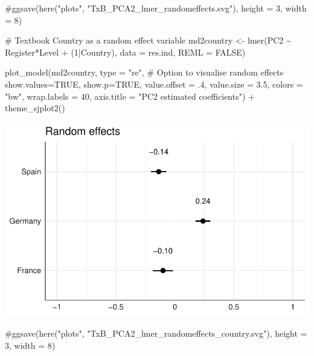 \documentclass[
  letterpaper,
  DIV=11,
  numbers=noendperiod]{scrreprt}
\newenvironment{Shaded}{\begin{snugshade}}{\end{snugshade}}
\newcommand{\AttributeTok}[1]{\textcolor[rgb]{0.40,0.45,0.13}{#1}}
\newcommand{\CommentTok}[1]{\textcolor[rgb]{0.37,0.37,0.37}{#1}}
\newcommand{\ConstantTok}[1]{\textcolor[rgb]{0.56,0.35,0.01}{#1}}
\newcommand{\DecValTok}[1]{\textcolor[rgb]{0.68,0.00,0.00}{#1}}
\newcommand{\FloatTok}[1]{\textcolor[rgb]{0.68,0.00,0.00}{#1}}
\newcommand{\FunctionTok}[1]{\textcolor[rgb]{0.28,0.35,0.67}{#1}}
\newcommand{\NormalTok}[1]{\textcolor[rgb]{0.00,0.23,0.31}{#1}}
\newcommand{\OtherTok}[1]{\textcolor[rgb]{0.00,0.23,0.31}{#1}}
\newcommand{\SpecialCharTok}[1]{\textcolor[rgb]{0.37,0.37,0.37}{#1}}
\newcommand{\StringTok}[1]{\textcolor[rgb]{0.13,0.47,0.30}{#1}}
\begin{document}
\begin{Shaded}
\begin{Highlighting}[]
\CommentTok{\#ggsave(here("plots", "TxB\_PCA2\_lmer\_randomeffects.svg"), height = 3, width = 8)}

\CommentTok{\# Textbook Country as a random effect variable}
\NormalTok{md2country }\OtherTok{\textless{}{-}} \FunctionTok{lmer}\NormalTok{(PC2 }\SpecialCharTok{\textasciitilde{}}\NormalTok{ Register}\SpecialCharTok{*}\NormalTok{Level }\SpecialCharTok{+}\NormalTok{ (}\DecValTok{1}\SpecialCharTok{|}\NormalTok{Country), }\AttributeTok{data =}\NormalTok{ res.ind, }\AttributeTok{REML =} \ConstantTok{FALSE}\NormalTok{)}

\FunctionTok{plot\_model}\NormalTok{(md2country, }
           \AttributeTok{type =} \StringTok{"re"}\NormalTok{, }\CommentTok{\# Option to visualise random effects}
           \AttributeTok{show.values=}\ConstantTok{TRUE}\NormalTok{, }
           \AttributeTok{show.p=}\ConstantTok{TRUE}\NormalTok{,}
           \AttributeTok{value.offset =}\NormalTok{ .}\DecValTok{4}\NormalTok{,}
           \AttributeTok{value.size =} \FloatTok{3.5}\NormalTok{,}
           \AttributeTok{colors =} \StringTok{"bw"}\NormalTok{,}
           \AttributeTok{wrap.labels =} \DecValTok{40}\NormalTok{,}
           \AttributeTok{axis.title =} \StringTok{"PC2 estimated coefficients"}\NormalTok{) }\SpecialCharTok{+}
  \FunctionTok{theme\_sjplot2}\NormalTok{()}
\end{Highlighting}
\end{Shaded}

\includegraphics{E_Ch6_Analysis_files/figure-pdf/Dim2random-2.pdf}

\begin{Shaded}
\begin{Highlighting}[]
\CommentTok{\#ggsave(here("plots", "TxB\_PCA2\_lmer\_randomeffects\_country.svg"), height = 3, width = 8)}
\end{Highlighting}
\end{Shaded}
\end{document}
